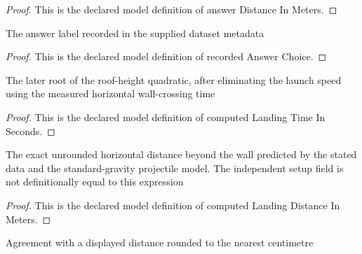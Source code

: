 \begin{proof}
  This is the declared model definition of answer Distance In Meters.
\end{proof}
\begin{definition}
  \label{def:physics:phyx-mini-0685:phyxminiproblems-problemphyxmini0685-recordedanswerchoice}
  The answer label recorded in the supplied dataset metadata
\end{definition}
\begin{proof}
  This is the declared model definition of recorded Answer Choice.
\end{proof}
\begin{definition}
  \label{def:physics:phyx-mini-0685:phyxminiproblems-problemphyxmini0685-computedlandingtimeinseconds}
  The later root of the roof-height quadratic, after eliminating the launch speed using the measured horizontal wall-crossing time
\end{definition}
\begin{proof}
  This is the declared model definition of computed Landing Time In Seconds.
\end{proof}
\begin{definition}
  \label{def:physics:phyx-mini-0685:phyxminiproblems-problemphyxmini0685-computedlandingdistanceinmeters}
  The exact unrounded horizontal distance beyond the wall predicted by the stated data and the standard-gravity projectile model. The independent setup field is not definitionally equal to this expression
\end{definition}
\begin{proof}
  This is the declared model definition of computed Landing Distance In Meters.
\end{proof}
\begin{definition}
  \label{def:physics:phyx-mini-0685:phyxminiproblems-problemphyxmini0685-matchesdisplayeddistance}
  Agreement with a displayed distance rounded to the nearest centimetre
\end{definition}
